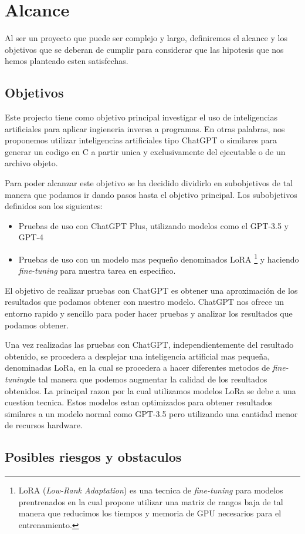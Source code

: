 \chapter{Alcance}
\label{cap:alcance}

Al ser un proyecto que puede ser complejo y largo, definiremos el alcance y los objetivos que se deberan de cumplir para considerar que las hipotesis que nos
hemos planteado esten satisfechas. 

\section{Objetivos}
\label{sec:objetivos}

Este projecto tiene como objetivo principal investigar el uso de inteligencias artificiales para aplicar ingieneria inversa a programas. 
En otras palabras, nos proponemos utilizar inteligencias artificiales tipo ChatGPT o similares para generar un codigo en C a partir unica
y exclusivamente del ejecutable o de un archivo objeto.

Para poder alcanzar este objetivo se ha decidido dividirlo en subobjetivos de tal manera que podamos ir dando pasos hasta el objetivo principal.
Los subobjetivos definidos son los siguientes:

\begin{itemize}
    \item Pruebas de uso con ChatGPT Plus, utilizando modelos como el GPT-3.5 y GPT-4
    \item Pruebas de uso con un modelo mas pequeño denominados LoRA \footnote{LoRA (\textit{Low-Rank Adaptation}) es una tecnica de \textit{fine-tuning} para modelos
          prentrenados en la cual propone utilizar una matriz de rangos baja de tal manera que reducimos los tiempos y memoria de GPU necesarios para el entrenamiento.} 
          y haciendo \textit{fine-tuning} para nuestra tarea en especifico.
\end{itemize}

El objetivo de realizar pruebas con ChatGPT es obtener una aproximación de los resultados que podamos obtener con nuestro modelo. ChatGPT nos
ofrece un entorno rapido y sencillo para poder hacer pruebas y analizar los resultados que podamos obtener.

Una vez realizadas las pruebas con ChatGPT, independientemente del resultado obtenido, se procedera a desplejar una inteligencia artificial mas pequeña,
denominadas LoRa, en la cual se procedera a hacer diferentes metodos de \textit{fine-tuning}de tal manera que podemos augmentar la calidad de los resultados
obtenidos. La principal razon por la cual utilizamos modelos LoRa se debe a una cuestion tecnica. Estos modelos estan optimizados para obtener resultados
similares a un modelo normal como GPT-3.5 pero utilizando una cantidad menor de recursos hardware.

\section{Posibles riesgos y obstaculos}
\label{sec:riesgos}